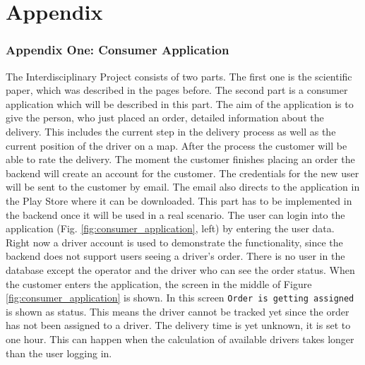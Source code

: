 \part*{Appendix}
\renewcommand{\thesection}{\arabic{section}}
\renewcommand{\theequation}{\arabic{equation}}
\section{Appendix One: Consumer Application}\label{section:Appendix One: Consumer Application}

The Interdisciplinary Project consists of two parts. The first one is the scientific paper, which was described in the pages before. The second part is a consumer application which will be described in this part.\newline
The aim of the application is to give the person, who just placed an order, detailed  information about the delivery. This includes the current step in the delivery process as well as the current position of the driver on a map. After the process the customer will be able to rate the delivery.\newline
The moment the customer finishes placing an order the backend will create an account for the customer. The credentials for the new user will be sent to the customer by email. The email also directs to the application in the Play Store where it can be downloaded. This part has to be implemented in the backend once it will be used in a real scenario.\newline
The user can login into the application (Fig. \ref{fig:consumer_application}, left) by entering the user data. Right now a driver account is used to demonstrate the functionality, since the backend does not support users seeing a driver’s order. There is no user in the database except the operator and the driver who can see the order status.\newline
When the customer enters the application, the screen in the middle of Figure \ref{fig:consumer_application} is shown. In this screen \texttt{Order is getting assigned} is shown as status. This means the driver cannot be tracked yet since the order has not been assigned to a driver. The delivery time is yet unknown, it is set to one hour. This can happen when the calculation of available drivers takes longer than the user logging in.\newline
